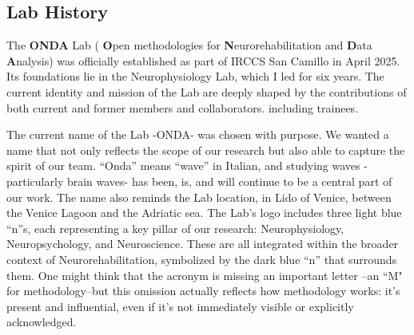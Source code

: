 \documentclass[12pt]{article}
\begin{document}
\subsection{Lab History}
The \textbf{ONDA} Lab ( \textbf{O}pen methodologies for \textbf{N}eurorehabilitation and \textbf{D}ata \textbf{A}nalysis) was officially established as part of IRCCS San Camillo in April 2025. Its foundations lie in the Neurophysiology Lab, which I led for six years.
The current identity and mission of the Lab are deeply shaped by the contributions of both current and former members and collaborators. including trainees. 

The current name of the Lab -ONDA- was chosen with purpose. We wanted a name that not only reflects the scope of our research but also able to capture the spirit of our team.
``Onda'' means ``wave'' in Italian, and studying waves -particularly brain waves- has been, is, and will continue to be a central part of our work. The name also reminds the Lab location, in Lido of Venice, between the Venice Lagoon and the Adriatic sea.
The Lab's logo includes three light blue ``n''s, each representing a key pillar of our research: Neurophysiology, Neuropsychology, and Neuroscience. These are all integrated within the broader context of Neurorehabilitation, symbolized by the dark blue ``n'' that surrounds them.
One might think that the acronym is missing an important letter --an ``M" for methodology--but this omission actually reflects how methodology works: it's present and influential, even if it's not immediately visible or explicitly acknowledged.
\end{document}
